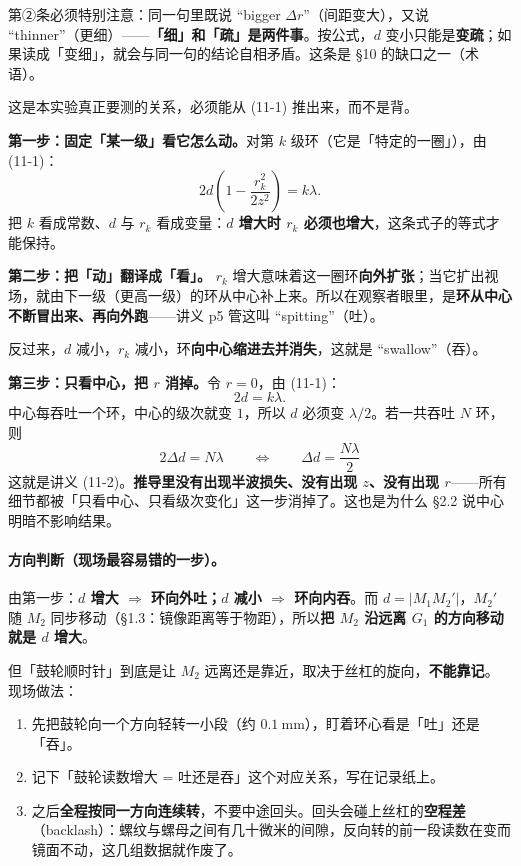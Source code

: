 \documentclass[11pt]{ctexart}
\begin{document}
第②条必须特别注意：同一句里既说 ``bigger \(\Delta r\)''（间距变大），又说 ``thinner''（更细）——\textbf{「细」和「疏」是两件事}。按公式，\(d\) 变小只能是\textbf{变疏}；如果读成「变细」，就会与同一句的结论自相矛盾。这条是 §10 的缺口之一（术语）。


这是本实验真正要测的关系，必须能从 (11-1) 推出来，而不是背。

\textbf{第一步：固定「某一级」看它怎么动。}对第 \(k\) 级环（它是「特定的一圈」），由 (11-1)：
\[
2d\left(1-\frac{r_k^2}{2z^2}\right)=k\lambda .
\]
把 \(k\) 看成常数、\(d\) 与 \(r_k\) 看成变量：\textbf{\(d\) 增大时 \(r_k\) 必须也增大}，这条式子的等式才能保持。

\textbf{第二步：把「动」翻译成「看」。} \(r_k\) 增大意味着这一圈环\textbf{向外扩张}；当它扩出视场，就由下一级（更高一级）的环从中心补上来。所以在观察者眼里，是\textbf{环从中心不断冒出来、再向外跑}——讲义 p5 管这叫 ``spitting''（吐）。

反过来，\(d\) 减小，\(r_k\) 减小，环\textbf{向中心缩进去并消失}，这就是 ``swallow''（吞）。

\textbf{第三步：只看中心，把 \(r\) 消掉。}令 \(r=0\)，由 (11-1)：
\[
2d=k\lambda .
\]
中心每吞吐一个环，中心的级次就变 \(1\)，所以 \(d\) 必须变 \(\lambda/2\)。若一共吞吐 \(N\) 环，则
\[
\boxed{\;2\Delta d=N\lambda\qquad\Longleftrightarrow\qquad \Delta d=\frac{N\lambda}{2}\;}
\tag{11-2}
\]
这就是讲义 (11-2)。\textbf{推导里没有出现半波损失、没有出现 \(z\)、没有出现 \(r\)}——所有细节都被「只看中心、只看级次变化」这一步消掉了。这也是为什么 §2.2 说中心明暗不影响结果。

\paragraph{方向判断（现场最容易错的一步）。}由第一步：\textbf{\(d\) 增大 $\Rightarrow$ 环向外吐；\(d\) 减小 $\Rightarrow$ 环向内吞}。而 \(d=|M_1M_2'|\)，\(M_2'\) 随 \(M_2\) 同步移动（§1.3：镜像距离等于物距），所以\textbf{把 \(M_2\) 沿远离 \(G_1\) 的方向移动就是 \(d\) 增大}。

但「鼓轮顺时针」到底是让 \(M_2\) 远离还是靠近，取决于丝杠的旋向，\textbf{不能靠记}。现场做法：

\begin{enumerate}
\item 先把鼓轮向一个方向轻转一小段（约 \(0.1\ \mathrm{mm}\)），盯着环心看是「吐」还是「吞」。
\item 记下「鼓轮读数增大 = 吐还是吞」这个对应关系，写在记录纸上。
\item 之后\textbf{全程按同一方向连续转}，不要中途回头。回头会碰上丝杠的\textbf{空程差}（backlash）：螺纹与螺母之间有几十微米的间隙，反向转的前一段读数在变而镜面不动，这几组数据就作废了。
\end{enumerate}
\end{document}
